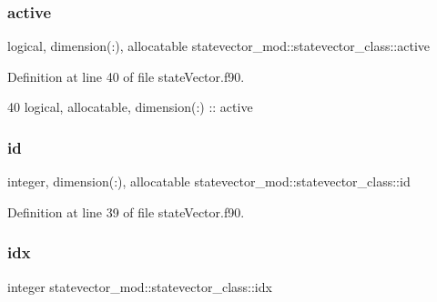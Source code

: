 \subsubsection{\texorpdfstring{active}{active}}
{\footnotesize\ttfamily logical, dimension(\+:), allocatable statevector\+\_\+mod\+::statevector\+\_\+class\+::active\hspace{0.3cm}{\ttfamily [private]}}



Definition at line 40 of file state\+Vector.\+f90.


\begin{DoxyCode}
40         \textcolor{keywordtype}{logical}, \textcolor{keywordtype}{allocatable}, \textcolor{keywordtype}{dimension(:)} :: active
\end{DoxyCode}
\mbox{\label{structstatevector__mod_1_1statevector__class_ae5b035e5a520de4f55c4b5ba6017f82c}} 
\subsubsection{\texorpdfstring{id}{id}}
{\footnotesize\ttfamily integer, dimension(\+:), allocatable statevector\+\_\+mod\+::statevector\+\_\+class\+::id\hspace{0.3cm}{\ttfamily [private]}}



Definition at line 39 of file state\+Vector.\+f90.

\mbox{\label{structstatevector__mod_1_1statevector__class_a7cdf76beffd46644d2ebe4fff6b50b2e}} 
\subsubsection{\texorpdfstring{idx}{idx}}
{\footnotesize\ttfamily integer statevector\+\_\+mod\+::statevector\+\_\+class\+::idx\hspace{0.3cm}{\ttfamily [private]}}




